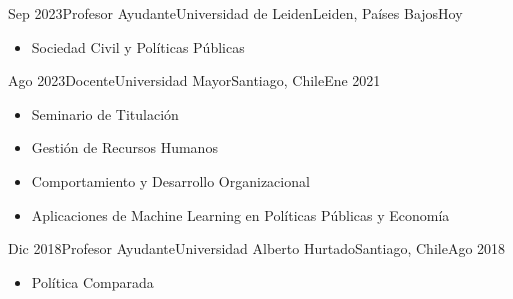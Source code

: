 





\begin{experiences}
  \experience
    {Sep 2023}{Profesor Ayudante}{Universidad de Leiden}{Leiden, Países Bajos}{Hoy}
    {\begin{itemize}
    \item Sociedad Civil y Políticas Públicas
    \end{itemize}}
    {}
\end{experiences}
\vspace{-2mm}

\begin{experiences}
  \experience
    {Ago 2023}{Docente}{Universidad Mayor}{Santiago, Chile}{Ene 2021}
    {\begin{itemize}
    \item Seminario de Titulación
    \item Gestión de Recursos Humanos
    \item Comportamiento y Desarrollo Organizacional
    \item Aplicaciones de Machine Learning en Políticas Públicas y Economía
    \end{itemize}}
    {}
\end{experiences}
\vspace{-2mm}

\begin{experiences}
  \experience
    {Dic 2018}{Profesor Ayudante}{Universidad Alberto Hurtado}{Santiago, Chile}{Ago 2018}
    {\begin{itemize}
    \item Política Comparada
    \end{itemize}}
    {}
\end{experiences}
\vspace{-2mm}


